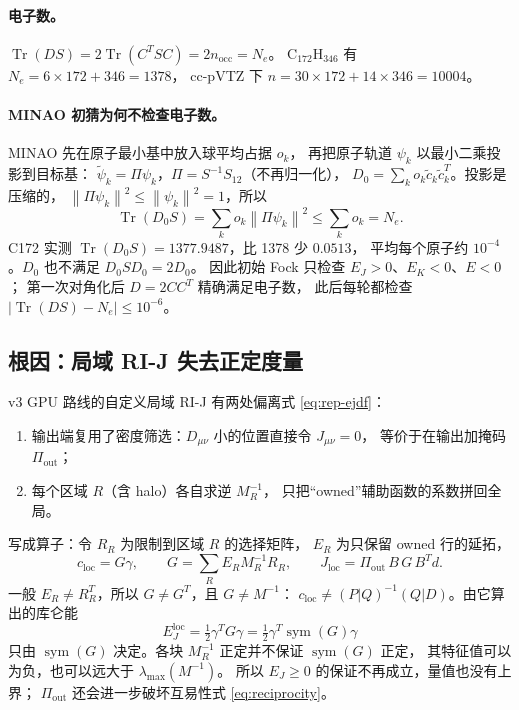 \documentclass[UTF8,fontset=fandol,11pt,a4paper]{ctexart}
\numberwithin{equation}{section}
\newcommand{\Tr}{\operatorname{Tr}}
\newcommand{\sym}{\operatorname{sym}}
\newcommand{\norm}[1]{\left\lVert #1\right\rVert}
\begin{document}
\paragraph{电子数。}
\(\Tr(DS)=2\Tr(C^TSC)=2n_{\mathrm{occ}}=N_e\)。
C\(_{172}\)H\(_{346}\) 有 \(N_e=6\times172+346=1378\)，
cc-pVTZ 下 \(n=30\times172+14\times346=10004\)。

\paragraph{MINAO 初猜为何不检查电子数。}
MINAO 先在原子最小基中放入球平均占据 \(o_k\)，
再把原子轨道 \(\psi_k\) 以最小二乘投影到目标基：
\(\tilde\psi_k=\Pi\psi_k\)，\(\Pi=S^{-1}S_{12}\)（不再归一化），
\(D_0=\sum_ko_k\tilde c_k\tilde c_k^T\)。投影是压缩的，
\(\norm{\Pi\psi_k}^2\leq\norm{\psi_k}^2=1\)，所以
\begin{equation}
\Tr(D_0S)=\sum_ko_k\norm{\Pi\psi_k}^2\leq\sum_ko_k=N_e .
\end{equation}
C172 实测 \(\Tr(D_0S)=1377.9487\)，比 1378 少 \(0.0513\)，
平均每个原子约 \(10^{-4}\)。\(D_0\) 也不满足 \(D_0SD_0=2D_0\)。
因此初始 Fock 只检查 \(E_J>0\)、\(E_K<0\)、\(E<0\)；
第一次对角化后 \(D=2CC^T\) 精确满足电子数，
此后每轮都检查 \(|\Tr(DS)-N_e|\leq10^{-6}\)。

\subsection{根因：局域 RI-J 失去正定度量}
\label{sec:repair-root}
v3 GPU 路线的自定义局域 RI-J 有两处偏离式 \eqref{eq:rep-ejdf}：
\begin{enumerate}
\item 输出端复用了密度筛选：\(D_{\mu\nu}\) 小的位置直接令 \(J_{\mu\nu}=0\)，
等价于在输出加掩码 \(\Pi_{\mathrm{out}}\)；
\item 每个区域 \(R\)（含 halo）各自求逆 \(M_R^{-1}\)，
只把“owned”辅助函数的系数拼回全局。
\end{enumerate}
写成算子：令 \(R_R\) 为限制到区域 \(R\) 的选择矩阵，
\(E_R\) 为只保留 owned 行的延拓，
\begin{equation}
c_{\mathrm{loc}}=G\gamma,\qquad
G=\sum_RE_RM_R^{-1}R_R,\qquad
J_{\mathrm{loc}}=\Pi_{\mathrm{out}}\,B\,G\,B^Td .
\label{eq:rep-gloc}
\end{equation}
一般 \(E_R\neq R_R^T\)，所以 \(G\neq G^T\)，且 \(G\neq M^{-1}\)：
\(c_{\mathrm{loc}}\neq(P|Q)^{-1}(Q|D)\)。由它算出的库仑能
\begin{equation}
E_J^{\mathrm{loc}}=\tfrac12\gamma^TG\gamma
=\tfrac12\gamma^T\sym(G)\gamma
\end{equation}
只由 \(\sym(G)\) 决定。各块 \(M_R^{-1}\) 正定并不保证 \(\sym(G)\) 正定，
其特征值可以为负，也可以远大于 \(\lambda_{\max}(M^{-1})\)。
所以 \(E_J\geq0\) 的保证不再成立，量值也没有上界；
\(\Pi_{\mathrm{out}}\) 还会进一步破坏互易性式 \eqref{eq:reciprocity}。
\end{document}

